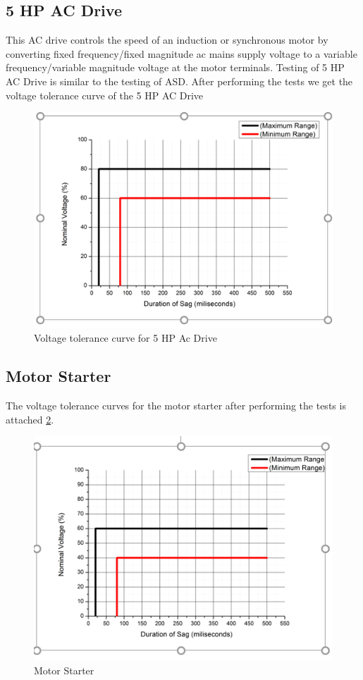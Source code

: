 \documentclass[17pt, a4paper]{extreport}
\begin{document}
\begin{enumerate}
 \subsection{5 HP AC Drive} This AC drive controls the speed of an induction or synchronous motor by converting fixed frequency/fixed magnitude ac mains supply voltage to a variable frequency/variable magnitude voltage at the motor terminals. Testing of 5 HP AC Drive is similar to the testing of ASD. After performing the tests we get the voltage tolerance curve of the 5 HP AC Drive
 \begin{figure}
     \centering
     \includegraphics[width=\textwidth]{5hpacdrive.PNG}
     \caption{Voltage tolerance curve for 5 HP Ac Drive}
     \label{fig:5hp_ac_drive}
 \end{figure}
 \subsection{Motor Starter}The voltage tolerance curves for the motor starter after performing the tests is attached \ref{fig:motor_starter}.
 \begin{figure}
     \centering
     \includegraphics[width=\textwidth]{motorstarter.PNG}
     \caption{Motor Starter}
     \label{fig:motor_starter}
 \end{figure}

\end{enumerate}
\end{document}
